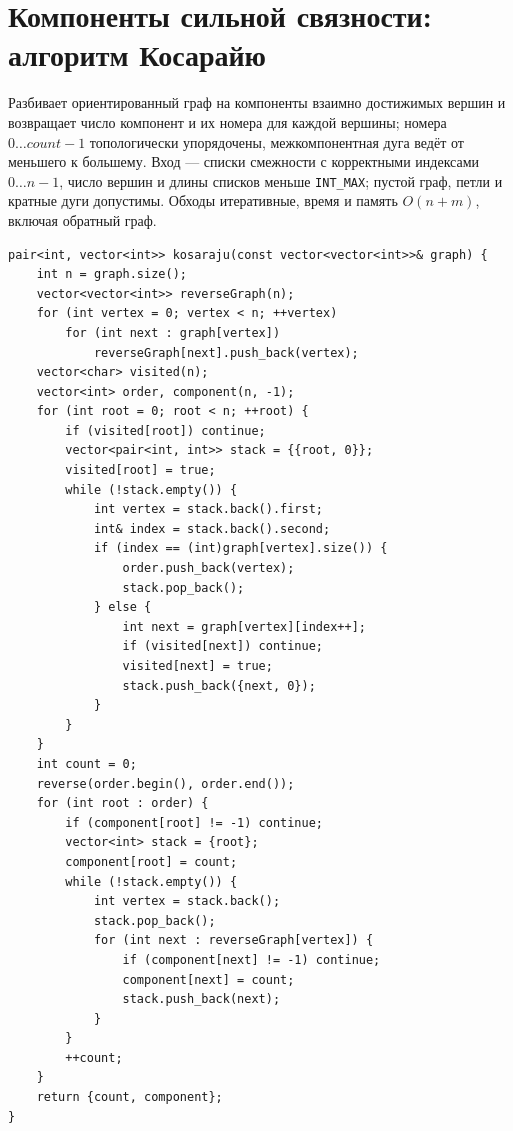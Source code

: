 %

\section{Компоненты сильной связности: алгоритм Косарайю}
Разбивает ориентированный граф на компоненты взаимно достижимых вершин и возвращает число компонент и их номера для каждой вершины; номера $0\ldots count-1$ топологически упорядочены, межкомпонентная дуга ведёт от меньшего к большему.
Вход --- списки смежности с корректными индексами $0\ldots n-1$, число вершин и длины списков меньше \texttt{INT\_MAX}; пустой граф, петли и кратные дуги допустимы.
Обходы итеративные, время и память $O(n+m)$, включая обратный граф.
\begin{lstlisting}[name=graphs_kosaraju]
pair<int, vector<int>> kosaraju(const vector<vector<int>>& graph) {
    int n = graph.size();
    vector<vector<int>> reverseGraph(n);
    for (int vertex = 0; vertex < n; ++vertex)
        for (int next : graph[vertex])
            reverseGraph[next].push_back(vertex);
    vector<char> visited(n);
    vector<int> order, component(n, -1);
    for (int root = 0; root < n; ++root) {
        if (visited[root]) continue;
        vector<pair<int, int>> stack = {{root, 0}};
        visited[root] = true;
        while (!stack.empty()) {
            int vertex = stack.back().first;
            int& index = stack.back().second;
            if (index == (int)graph[vertex].size()) {
                order.push_back(vertex);
                stack.pop_back();
            } else {
                int next = graph[vertex][index++];
                if (visited[next]) continue;
                visited[next] = true;
                stack.push_back({next, 0});
            }
        }
    }
    int count = 0;
    reverse(order.begin(), order.end());
    for (int root : order) {
        if (component[root] != -1) continue;
        vector<int> stack = {root};
        component[root] = count;
        while (!stack.empty()) {
            int vertex = stack.back();
            stack.pop_back();
            for (int next : reverseGraph[vertex]) {
                if (component[next] != -1) continue;
                component[next] = count;
                stack.push_back(next);
            }
        }
        ++count;
    }
    return {count, component};
}
\end{lstlisting}
